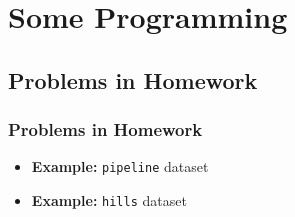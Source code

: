\documentclass[serif,mathserif,professionalfont]{beamer}
\begin{document}
%	
%	
%	






\section{Some Programming}


\subsection{Problems in Homework}



\begin{frame}
	
	\frametitle{Problems in Homework}
	
	
	\begin{itemize}
		\item \textbf{Example:} \texttt{pipeline} dataset
		\item \textbf{Example:} \texttt{hills} dataset
	\end{itemize}
	
	
	
\end{frame}
\end{document}
